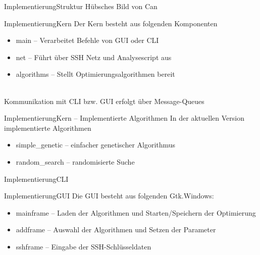 \documentclass[ngerman,10pt,xcolor=colortbl,compress
]{beamer}
\begin{document}
	
	\begin{frame}{Implementierung}{Struktur}
	Hübsches Bild von Can
	\end{frame}
	\begin{frame}{Implementierung}{Kern}
	Der Kern besteht aus folgenden Komponenten
	\begin{itemize}
		\item main -- Verarbeitet Befehle von GUI oder CLI
		\item net -- Führt über SSH Netz und Analysescript aus
		\item algorithms -- Stellt Optimierungsalgorithmen bereit 
	\end{itemize}
	\mbox{}\\
	Kommunikation mit CLI bzw. GUI erfolgt über Message-Queues
	\end{frame}
	
	\begin{frame}{Implementierung}{Kern -- Implementierte Algorithmen}
	In der aktuellen Version implementierte Algorithmen
	\begin{itemize}
		\item simple\_genetic -- einfacher genetischer Algorithmus
		\item random\_search -- randomisierte Suche
	\end{itemize}
	\end{frame}
	
	\begin{frame}{Implementierung}{CLI}
	\makeset
	\end{frame}

	\begin{frame}{Implementierung}{GUI}
	Die GUI besteht aus folgenden Gtk.Windows:
	\begin{itemize}
		\item mainframe -- Laden der Algorithmen und Starten/Speichern der Optimierung
		\item addframe -- Auswahl der Algorithmen und Setzen der Parameter
		\item sshframe -- Eingabe der SSH-Schlüsseldaten
	\end{itemize}
	\end{frame}
	
\end{document}
